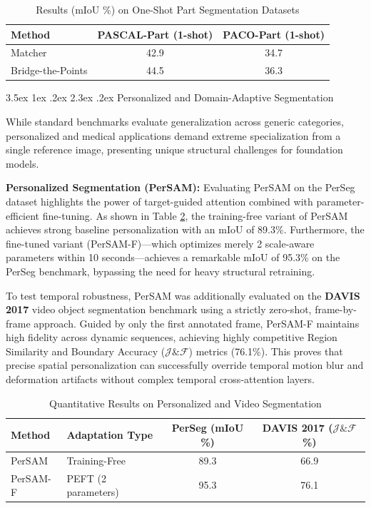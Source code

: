 \documentclass[journal,12pt,onecolumn,draftclsnofoot]{IEEEtran}
\makeatletter
\renewcommand{\section}{\@startsection{section}{1}{\z@}%
    {3.5ex \@plus 1ex \@minus .2ex}%
    {2.3ex \@plus.2ex}%
    {\normalfont\Large\bfseries}}
\makeatother
\begin{document}
\begin{table}[htbp]
\centering
\caption{Results (mIoU \%) on One-Shot Part Segmentation Datasets}
\label{tab:part_seg}
\begin{tabular}{l c c}
\toprule
\textbf{Method} & \textbf{PASCAL-Part (1-shot)} & \textbf{PACO-Part (1-shot)} \\
\midrule
Matcher \cite{liu2023matcher} & 42.9 & 34.7 \\
Bridge-the-Points \cite{zhang2024bridge} & 44.5 & 36.3 \\
\bottomrule
\end{tabular}
\end{table}

\section{Personalized and Domain-Adaptive Segmentation}

While standard benchmarks evaluate generalization across generic categories, personalized and medical applications demand extreme specialization from a single reference image, presenting unique structural challenges for foundation models.

\noindent\textbf{Personalized Segmentation (PerSAM):}
Evaluating PerSAM on the PerSeg dataset highlights the power of target-guided attention combined with parameter-efficient fine-tuning. As shown in Table \ref{tab:persam_results}, the training-free variant of PerSAM achieves strong baseline personalization with an mIoU of 89.3\%. Furthermore, the fine-tuned variant (PerSAM-F)—which optimizes merely 2 scale-aware parameters within 10 seconds—achieves a remarkable mIoU of 95.3\% on the PerSeg benchmark, bypassing the need for heavy structural retraining.

To test temporal robustness, PerSAM was additionally evaluated on the \textbf{DAVIS 2017} video object segmentation benchmark using a strictly zero-shot, frame-by-frame approach. Guided by only the first annotated frame, PerSAM-F maintains high fidelity across dynamic sequences, achieving highly competitive Region Similarity and Boundary Accuracy ($\mathcal{J}\&\mathcal{F}$) metrics (76.1\%). This proves that precise spatial personalization can successfully override temporal motion blur and deformation artifacts without complex temporal cross-attention layers.

\begin{table}[htbp]
\centering
\caption{Quantitative Results on Personalized and Video Segmentation}
\label{tab:persam_results}
\begin{tabular}{l l c c}
\toprule
\textbf{Method} & \textbf{Adaptation Type} & \textbf{PerSeg (mIoU \%)} & \textbf{DAVIS 2017 ($\mathcal{J}\&\mathcal{F}$ \%)} \\
\midrule
PerSAM \cite{zhang2024persam} & Training-Free & 89.3 & 66.9 \\
PerSAM-F \cite{zhang2024persam} & PEFT (2 parameters) & 95.3 & 76.1 \\
\bottomrule
\end{tabular}
\end{table}
\end{document}
